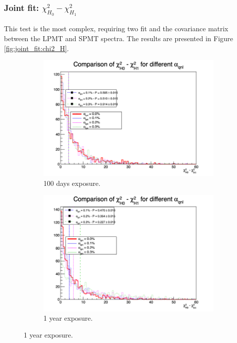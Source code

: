 \documentclass[../main.tex]{subfiles}
\begin{document}
\subsubsection{Joint fit: $\chi^2_{H_0} - \chi^2_{H_1}$}
This test is the most complex, requiring two fit and the covariance matrix between the LPMT and SPMT spectra. The results are presented in Figure \ref{fig:joint_fit:chi2_H}.

\begin{figure}[th]
  \centering
  \begin{subfigure}[t]{0.48\linewidth}
    \includegraphics[width=\linewidth]{images/joint_fit/stat_tests/chi2_H_100d.png}
    \caption{100 days exposure.}
  \end{subfigure}
  \begin{subfigure}[t]{0.48\linewidth}
    \includegraphics[width=\linewidth]{images/joint_fit/stat_tests/chi2_H_1y.png}
    \caption{1 year exposure.}
  \end{subfigure}



\end{figure}
\end{document}
